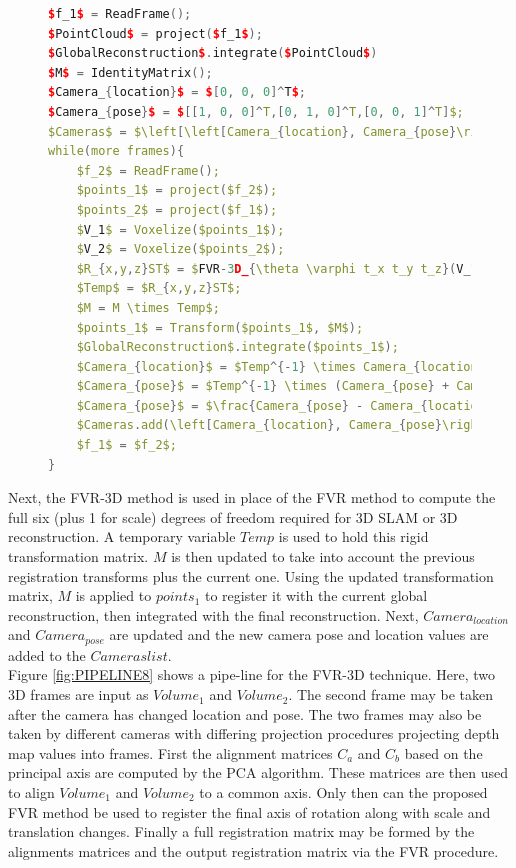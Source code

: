 \begin{figure}
\begin{lstlisting}[language=c++,caption=Phase Correlation Based SLAM Algorithm,label=algorithm:FVR3DSLAMX,mathescape,basicstyle=\ttfamily]
$f_1$ = ReadFrame();
$PointCloud$ = project($f_1$);
$GlobalReconstruction$.integrate($PointCloud$)
$M$ = IdentityMatrix();
$Camera_{location}$ = $[0, 0, 0]^T$;
$Camera_{pose}$ = $[[1, 0, 0]^T,[0, 1, 0]^T,[0, 0, 1]^T]$;
$Cameras$ = $\left[\left[Camera_{location}, Camera_{pose}\right] \right]$;
while(more frames){
	$f_2$ = ReadFrame();
	$points_1$ = project($f_2$);
	$points_2$ = project($f_1$);
	$V_1$ = Voxelize($points_1$);
	$V_2$ = Voxelize($points_2$);
	$R_{x,y,z}ST$ = $FVR-3D_{\theta \varphi t_x t_y t_z}(V_1, V_2)$;
	$Temp$ = $R_{x,y,z}ST$;
	$M = M \times Temp$;
	$points_1$ = Transform($points_1$, $M$);
	$GlobalReconstruction$.integrate($points_1$);
	$Camera_{location}$ = $Temp^{-1} \times Camera_{location}$;
	$Camera_{pose}$ = $Temp^{-1} \times (Camera_{pose} + Camera_{location})$;
	$Camera_{pose}$ = $\frac{Camera_{pose} - Camera_{location}}{Camera_{pose} - Camera_{location}}$;
	$Cameras.add(\left[Camera_{location}, Camera_{pose}\right])$;
	$f_1$ = $f_2$;
}
\end{lstlisting}
\end{figure}

Next, the FVR-3D method is used in place of the FVR method to compute the full six (plus 1 for scale) degrees of freedom required for 3D SLAM or 3D reconstruction. A temporary variable $Temp$ is used to hold this rigid transformation matrix. $M$ is then updated to take into account the previous registration transforms plus the current one. Using the updated transformation matrix, $M$ is applied to $points_1$ to register it with the current global reconstruction, then integrated with the final reconstruction. Next, $Camera_{location}$ and $Camera_{pose}$ are updated and the new camera pose and location values are added to the $Cameras list$. \\



Figure \ref{fig:PIPELINE8} shows a pipe-line for the FVR-3D technique. Here, two 3D frames are input as $Volume_1$ and $Volume_2$. The second frame may be taken after the camera has changed location and pose. The two frames may also be taken by different cameras with differing projection procedures projecting depth map values into frames. First the alignment matrices $C_a$ and $C_b$ based on the principal axis are computed by the PCA algorithm. These matrices are then used to align $Volume_1$ and $Volume_2$ to a common axis. Only then can the proposed FVR method be used to register the final axis of rotation along with scale and translation changes. Finally a full registration matrix may be formed by the alignments matrices and the output registration matrix via the FVR procedure. \\


